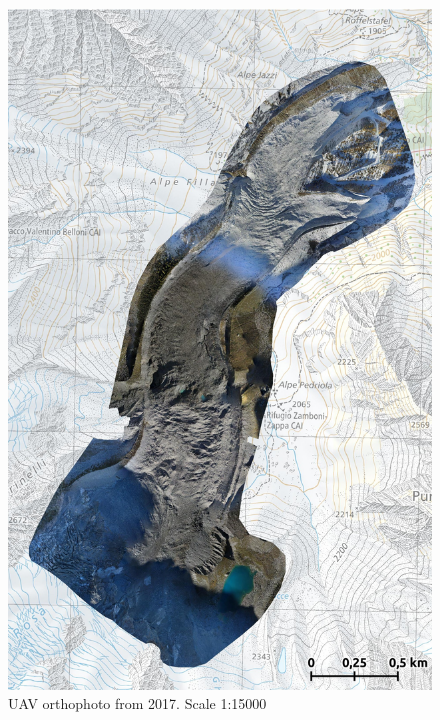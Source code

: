 \begin{figure}[p]
    \centering
    \includegraphics[width=\textwidth]{figures/appendix/orto_2017.jpg}
    \caption{UAV orthophoto from 2017. Scale 1:15000}
\end{figure}

